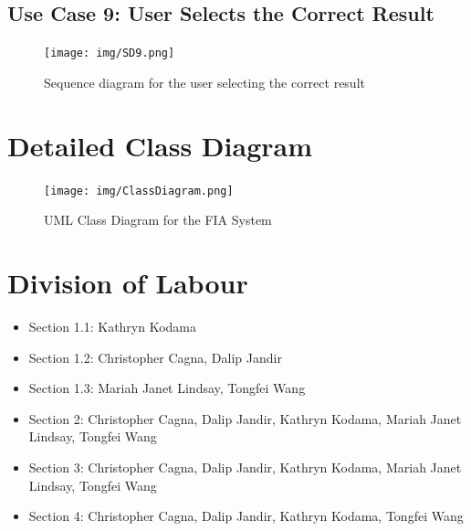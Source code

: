 \documentclass[12pt,fleqn]{article}
\begin{document}
\subsection{Use Case 9: User Selects the Correct Result}
\begin{figure}[H]
    \centering
    \texttt{[image: img/SD9.png]}
    \caption{Sequence diagram for the user selecting the correct result}
\end{figure}


\section{Detailed Class Diagram}
\begin{figure}[H]
    \centering
    \texttt{[image: img/ClassDiagram.png]}
    \caption{UML Class Diagram for the FIA System}
\end{figure}
\newpage
\appendix
\section{Division of Labour}
\begin{itemize}
    \item Section 1.1: Kathryn Kodama
    \item Section 1.2: Christopher Cagna, Dalip Jandir
    \item Section 1.3: Mariah Janet Lindsay, Tongfei Wang
    \item Section 2: Christopher Cagna, Dalip Jandir, Kathryn Kodama, Mariah Janet Lindsay, Tongfei Wang
    \item Section 3:  Christopher Cagna, Dalip Jandir, Kathryn Kodama, Mariah Janet Lindsay, Tongfei Wang
    \item Section 4:  Christopher Cagna, Dalip Jandir, Kathryn Kodama, Tongfei Wang
    
\end{itemize}
\end{document}
